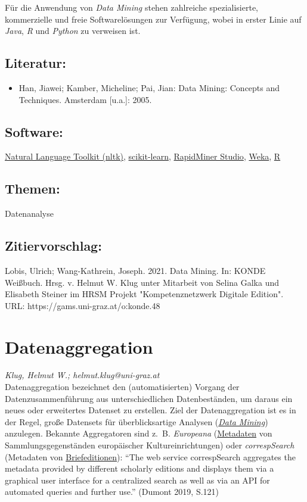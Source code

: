 \documentclass{article}
\begin{document}
        Für die Anwendung von \emph{Data Mining} stehen zahlreiche spezialisierte, kommerzielle und freie Softwarelösungen zur Verfügung, wobei in erster Linie auf \emph{Java}, \emph{R} und \emph{Python} zu verweisen ist.  \\
            
        \subsection*{Literatur:}\begin{itemize}\item Han, Jiawei; Kamber, Micheline; Pai, Jian: Data Mining: Concepts and Techniques. Amsterdam [u.a.]: 2005.\end{itemize}\subsection*{Software:}\href{https://www.nltk.org/}{Natural Language Toolkit (nltk)}, \href{https://scikit-learn.org/}{scikit-learn}, \href{https://rapidminer.com}{RapidMiner Studio}, \href{https://www.cs.waikato.ac.nz/ml/weka/}{Weka}, \href{https://www.r-project.org}{R}\subsection*{Themen:}Datenanalyse\subsection*{Zitiervorschlag:}Lobis, Ulrich; Wang-Kathrein, Joseph. 2021. Data Mining. In: KONDE Weißbuch. Hrsg. v. Helmut W. Klug unter Mitarbeit von Selina Galka und Elisabeth Steiner im HRSM Projekt "Kompetenznetzwerk Digitale Edition". URL: https://gams.uni-graz.at/o:konde.48\newpage\section*{Datenaggregation} \emph{Klug, Helmut W.; helmut.klug@uni-graz.at }\\
        
    Datenaggregation bezeichnet den (automatisierten) Vorgang der Datenzusammenführung aus unterschiedlichen Datenbeständen, um daraus ein neues oder erweitertes Datenset zu erstellen. Ziel der Datenaggregation ist es in der Regel, große Datensets für überblicksartige Analysen (\emph{\href{http://gams.uni-graz.at/o:konde.48}{Data Mining}}) anzulegen. Bekannte Aggregatoren sind z. B. \emph{Europeana} (\href{http://gams.uni-graz.at/o:konde.25}{Metadaten} von Sammlungsgegenständen europäischer Kultureinrichtungen) oder \emph{correspSearch} (Metadaten von \href{http://gams.uni-graz.at/o:konde.39}{Briefeditionen}): “The web service correspSearch aggregates the metadata provided by different scholarly editions and displays them via a graphical user interface for a centralized search as well as via an API for automated queries and further use.” (Dumont 2019, S.121)\\
            
\end{document}
